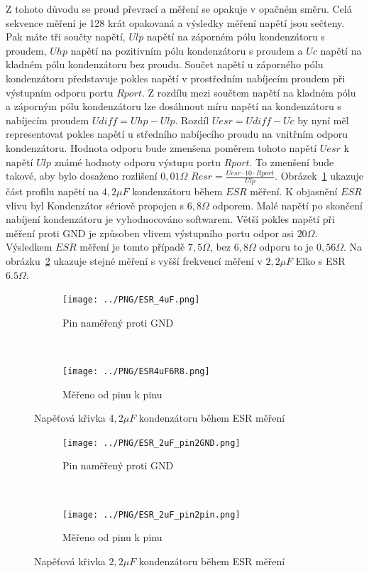 Z tohoto důvodu se proud převrací a měření se opakuje v opačném směru.
Celá sekvence měření je  128 krát opakovaná a výsledky měření napětí jsou sečteny.
Pak máte tři součty napětí, \(Ulp\) napětí na záporném pólu kondenzátoru s proudem, \(Uhp\) napětí na
pozitivním pólu kondenzátoru s proudem a \(Uc\) napětí na kladném pólu kondenzátoru bez proudu.
Součet napětí u záporného pólu kondenzátoru představuje pokles napětí v prostředním nabíjecím proudem při výstupním odporu portu \(Rport\).
Z rozdílu mezi součtem napětí na kladném pólu a záporným pólu kondenzátoru
lze dosáhnout míru napětí na kondenzátoru s nabíjecím proudem \(Udiff = Uhp - Ulp\).
Rozdíl \(Uesr = Udiff - Uc\) by nyní měl representovat pokles napětí u středního nabíjecího proudu na vnitřním odporu kondenzátoru.
Hodnota odporu bude zmenšena poměrem tohoto napětí \(Uesr\) k napětí \(Ulp\) známé hodnoty odporu výstupu
portu \(Rport\).
To zmenšení bude takové, aby bylo dosaženo rozlišení \(0,01 \Omega\) 
 \(Resr = \frac{Uesr \cdot 10 \cdot Rport}{Ulp}\).
Obrázek~\ref{pic:esr4} ukazuje část profilu napětí na \(4,2\mu F\) kondenzátoru během \(ESR\) měření.
K objasnění \(ESR\) vlivu byl Kondenzátor sériově propojen s \(6,8 \Omega\) odporem. 
Malé napětí po skončení nabíjení kondenzátoru je vyhodnocováno softwarem.
Větší pokles napětí při měření proti GND je způsoben vlivem výstupního portu odpor asi \(20\Omega\).
Výsledkem \(ESR\) měření je tomto případě \(7,5 \Omega\), bez \(6,8 \Omega\) odporu to je \(0,56\Omega\).
Na obrázku~\ref{pic:esr2} ukazuje stejné měření s vyšší frekvencí měření v \(2,2\mu F\)
Elko s ESR \(6.5\Omega\).


\begin{figure}[H]
  \begin{subfigure}[b]{.5\textwidth}
    \centering
    \texttt{[image: ../PNG/ESR\_4uF.png]}
    \caption{Pin naměřený proti GND}
  \end{subfigure}
  ~
  \begin{subfigure}[b]{.5\textwidth}
    \centering
    \texttt{[image: ../PNG/ESR4uF6R8.png]}
    \caption{Měřeno od pinu k pinu}
  \end{subfigure}
  \caption{Napěťová křivka \(4,2\mu F\) kondenzátoru během ESR měření}
  \label{pic:esr4}
\end{figure}

\begin{figure}[H]
  \begin{subfigure}[b]{.5\textwidth}
    \centering
    \texttt{[image: ../PNG/ESR\_2uF\_pin2GND.png]}
    \caption{Pin naměřený proti GND}
  \end{subfigure}
  ~
  \begin{subfigure}[b]{.5\textwidth}
    \centering
    \texttt{[image: ../PNG/ESR\_2uF\_pin2pin.png]}
    \caption{Měřeno od pinu k pinu}
  \end{subfigure}
  \caption{Napěťová křivka \(2,2\mu F\)  kondenzátoru během ESR měření}
  \label{pic:esr2}
\end{figure}


